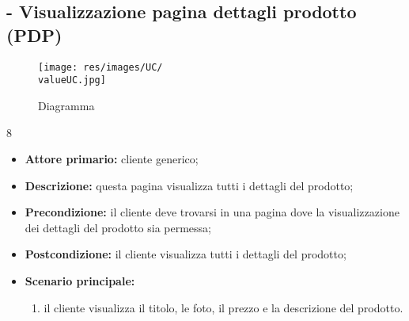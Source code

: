\stepUserCase
\subsection{ - Visualizzazione pagina dettagli prodotto (PDP)}
\begin{figure}[H]
    \centering
    \texttt{[image: res/images/UC/\\valueUC.jpg]}
    \caption{Diagramma }
\end{figure}8
\begin{itemize}
    \item \textbf{Attore primario:} cliente generico;
    \item \textbf{Descrizione:} questa pagina visualizza tutti i dettagli del prodotto;
    \item \textbf{Precondizione:} il cliente deve trovarsi in una pagina dove la visualizzazione dei dettagli del prodotto sia permessa;
    \item \textbf{Postcondizione:} il cliente visualizza tutti i dettagli del prodotto;
    \item \textbf{Scenario principale:}
          \begin{enumerate}
              \item il cliente visualizza il titolo, le foto, il prezzo e la descrizione del prodotto.
          \end{enumerate}
\end{itemize}


\stepUserCase
